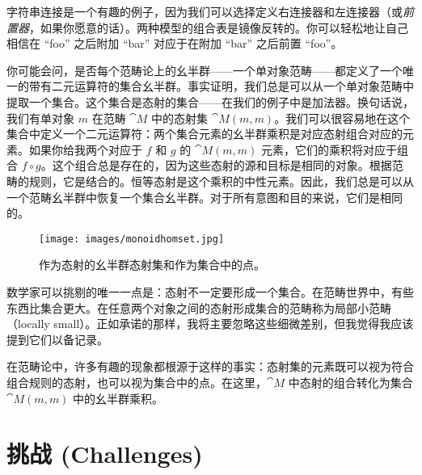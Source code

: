 \noindent
字符串连接是一个有趣的例子，因为我们可以选择定义右连接器和左连接器（或\emph{前置器}，如果你愿意的话）。两种模型的组合表是镜像反转的。你可以轻松地让自己相信在 “foo” 之后附加 “bar” 对应于在附加 “bar” 之后前置 “foo”。

你可能会问，是否每个范畴论上的幺半群——一个单对象范畴——都定义了一个唯一的带有二元运算符的集合幺半群。事实证明，我们总是可以从一个单对象范畴中提取一个集合。这个集合是态射的集合——在我们的例子中是加法器。换句话说，我们有单对象 $m$ 在范畴 $\cat{M}$ 中的态射集 $\cat{M}(m, m)$。我们可以很容易地在这个集合中定义一个二元运算符：两个集合元素的幺半群乘积是对应态射组合对应的元素。如果你给我两个对应于 $f$ 和 $g$ 的 $\cat{M}(m, m)$ 元素，它们的乘积将对应于组合 $f \circ g$。这个组合总是存在的，因为这些态射的源和目标是相同的对象。根据范畴的规则，它是结合的。恒等态射是这个乘积的中性元素。因此，我们总是可以从一个范畴幺半群中恢复一个集合幺半群。对于所有意图和目的来说，它们是相同的。

\begin{figure}[H]
  \centering
  \texttt{[image: images/monoidhomset.jpg]}
  \caption{作为态射的幺半群态射集和作为集合中的点。}
\end{figure}

\noindent
数学家可以挑剔的唯一一点是：态射不一定要形成一个集合。在范畴世界中，有些东西比集合更大。在任意两个对象之间的态射形成集合的范畴称为局部小范畴（locally small）。正如承诺的那样，我将主要忽略这些细微差别，但我觉得我应该提到它们以备记录。

在范畴论中，许多有趣的现象都根源于这样的事实：态射集的元素既可以视为符合组合规则的态射，也可以视为集合中的点。在这里，$\cat{M}$ 中态射的组合转化为集合 $\cat{M}(m, m)$ 中的幺半群乘积。

\section{挑战 (Challenges)}

